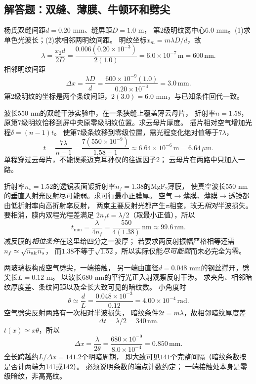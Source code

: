 \subsection{解答题：双缝、薄膜、牛顿环和劈尖}

\problemtext 杨氏双缝间距$d=0.20$ mm、缝屏距$D=1.0$ m，
第2级明纹离中心$6.0$ mm。(1)求单色光波长；(2)求相邻两明纹间距。
\workings
明纹坐标$x_m=m\lambda D/d$，故
\[
\boxed{\lambda=\frac{x_2d}{2D}
=\frac{0.006(0.20\times10^{-3})}{2(1.0)}
=6.0\times10^{-7}\,\mathrm m=600\,\mathrm{nm}}.
\]
相邻明纹间距
\[
\boxed{\Delta x=\frac{\lambda D}{d}
=\frac{600\times10^{-9}(1.0)}{0.20\times10^{-3}}
=3.0\,\mathrm{mm}}.
\]
\crosscheck 第2级明纹的坐标是两个条纹间距，$2(3.0)=6.0$ mm，与已知条件回代一致。

\problemtext 波长$550$ nm的双缝干涉实验中，在一条狭缝上覆盖薄云母片，
折射率$n=1.58$，原第7级明纹恰移到屏中央原零级明纹位置。求云母片厚度。
\workings
插片相对空气增加光程$\delta=(n-1)t$。
使第7级条纹移到零级位置，需光程变化绝对值等于$7\lambda$，
\[
\boxed{t=\frac{7\lambda}{n-1}
=\frac{7(550\times10^{-9})}{1.58-1}
\approx6.64\times10^{-6}\,\mathrm m=6.64\,\mu\mathrm m}.
\]
\crosscheck 单程穿过云母片，不能误乘迈克耳孙仪的往返因子2；
云母片在两路中只加入一路。

\problemtext 折射率$n_s=1.52$的透镜表面镀折射率$n_f=1.38$的MgF$_2$薄膜，
使真空波长$550$ nm的垂直入射光反射尽可能弱。求可行最小正膜厚。
\workings
空气$\to$薄膜、薄膜$\to$透镜都由低折射率向高折射率反射，
两束主要反射光都产生$\pi$相变，故无\emph{相对}半波损失。
要相消，膜内双程光程差满足
$2n_ft=\lambda/2$（取最小正值），所以
\[
\boxed{t_{\min}=\frac{\lambda}{4n_f}
=\frac{550}{4(1.38)}\,\mathrm{nm}
\approx99.6\,\mathrm{nm}}.
\]
\crosscheck 减反膜的\emph{相位条件}在这里给四分之一波厚；
若要求两反射振幅严格相等还需$n_f\simeq\sqrt{n_{\rm air}n_s}$，
而$1.38$不等于$\sqrt{1.52}$，所以实际仅能\emph{尽可能弱}而未必完全为零。

\problemtext 两玻璃板构成空气劈尖，一端接触，
另一端由直径$d=0.048$ mm的钢丝撑开，劈尖长$L=0.12$ m。
以波长$680$ nm的平行光正入射观察反射干涉。
求夹角、相邻暗纹厚度差、条纹间距以及全长大致可见的暗纹数。
\workings
小角度时
\[
\boxed{\theta\simeq\frac{d}{L}
=\frac{0.048\times10^{-3}}{0.12}
=4.00\times10^{-4}\,\mathrm{rad}}.
\]
空气劈尖反射两路有一次相对半波损失，
暗纹条件$2t=m\lambda$，故相邻暗纹厚度差
\[
\boxed{\Delta t=\lambda/2=340\,\mathrm{nm}}.
\]
$t(x)\simeq x\theta$，所以
\[
\boxed{\Delta x=\frac{\lambda}{2\theta}
=\frac{680\times10^{-9}}{8.0\times10^{-4}}
=0.850\,\mathrm{mm}}.
\]
全长跨越约$L/\Delta x=141.2$个明暗周期，
即大致可见$141$个完整间隔（暗纹条数按是否计两端为141或142）。
\crosscheck 必须说明条数的端点计数约定；
一端接触处本身是零级暗纹，非高亮纹。

